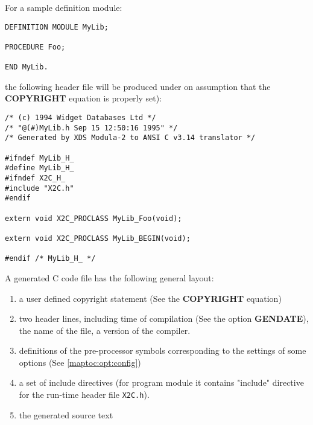 For a sample definition module:
\begin{verbatim}
DEFINITION MODULE MyLib;

PROCEDURE Foo;

END MyLib.
\end{verbatim}
the following header file will be produced under on assumption
that the {\bf COPYRIGHT} equation is properly set):
{\small
\begin{verbatim}
/* (c) 1994 Widget Databases Ltd */
/* "@(#)MyLib.h Sep 15 12:50:16 1995" */
/* Generated by XDS Modula-2 to ANSI C v3.14 translator */

#ifndef MyLib_H_
#define MyLib_H_
#ifndef X2C_H_
#include "X2C.h"
#endif

extern void X2C_PROCLASS MyLib_Foo(void);

extern void X2C_PROCLASS MyLib_BEGIN(void);

#endif /* MyLib_H_ */
\end{verbatim}
}

\noindent
A generated C code file  has  the
following general layout:
\begin{enumerate}
\item   a user defined copyright statement (See the {\bf COPYRIGHT}
        equation)

\item   two header lines, including time of compilation
        (See the option {\bf GENDATE}),
        the name of the file, a version of the \xds{} compiler.

\item   definitions of the pre-processor symbols corresponding
        to the settings of some options (See \ref{maptoc:opt:config})

\item   a set of include directives (for program module it contains
        "include" directive for the run-time header file {\tt X2C.h}).

\item   the generated source text

\end{enumerate}

